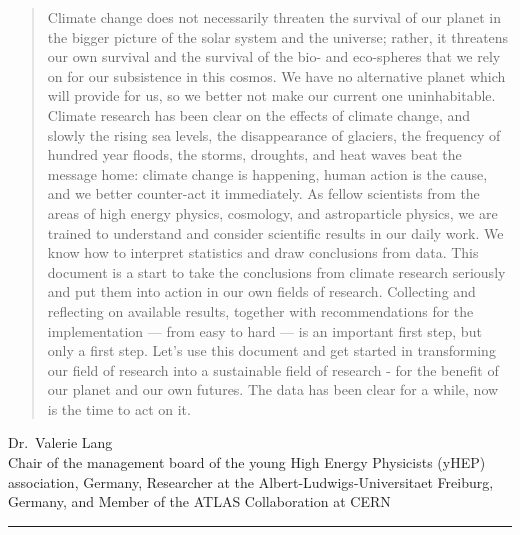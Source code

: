 \documentclass[../SustainableHEP.tex]{subfiles}
\begin{document}
\begin{quotation}
Climate change does not necessarily threaten the survival of our planet in the bigger picture of the solar system and the universe; rather, it threatens our own survival and the survival of the bio- and eco-spheres that we rely on for our subsistence in this cosmos. We have no alternative planet which will provide for us, so we better not make our current one uninhabitable.
Climate research has been clear on the effects of climate change, and slowly the rising sea levels, the disappearance of glaciers, the frequency of hundred year floods, the storms, droughts, and heat waves beat the message home: climate change is happening, human action is the cause, and we better counter-act it immediately.
As fellow scientists from the areas of high energy physics, cosmology, and astroparticle physics, we are trained to understand and consider scientific results in our daily work. We know how to interpret statistics and draw conclusions from data. 
This document is a start to take the conclusions from climate research seriously and put them into action in our own fields of research. Collecting and reflecting on available results, together with recommendations for the implementation --- from easy to hard --- is an important first step, but only a first step. Let's use this document and get started in transforming our field of research into a sustainable field of research - for the benefit of our planet and our own futures. The data has been clear for a while, now is the time to act on it.
\end{quotation}
\begin{flushleft}
Dr.~Valerie Lang \\
Chair of the management board of the young High Energy Physicists (yHEP) association, Germany,
Researcher at the Albert-Ludwigs-Universitaet Freiburg, Germany, and
Member of the ATLAS Collaboration at CERN
\end{flushleft}

\textcolor{Pythongreen}{\rule{2cm}{3pt}}
\end{document}
